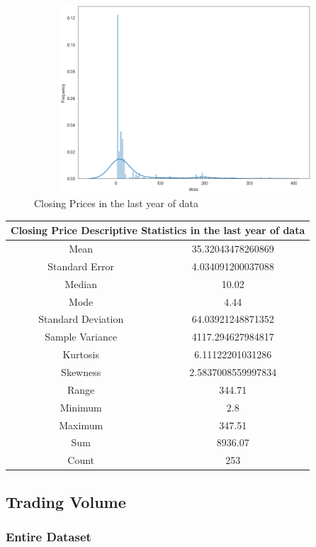 \begin{figure}[h!]
\centering
\includegraphics[width=15cm,height=7cm,keepaspectratio]{resultsEvaluation/closeDesc1.png}
\caption{Closing Prices in the last year of data}
\label{fig:appendix_closeDesc1}
\end{figure}
\begin{center}
\begin{tabular}{ c c }
\hline
\multicolumn{2}{|c|}{Closing Price Descriptive Statistics in the last year of data} \\
\hline
Mean & 35.32043478260869 \\
Standard Error & 4.034091200037088 \\
Median & 10.02 \\
Mode & 4.44 \\
Standard Deviation & 64.03921248871352 \\
Sample Variance & 4117.294627984817 \\
Kurtosis & 6.11122201031286 \\
Skewness & 2.5837008559997834 \\
Range & 344.71 \\
Minimum & 2.8 \\
Maximum & 347.51 \\
Sum & 8936.07 \\
Count & 253
\end{tabular}
\end{center}

\subsection{Trading Volume}

\subsubsection{Entire Dataset}

